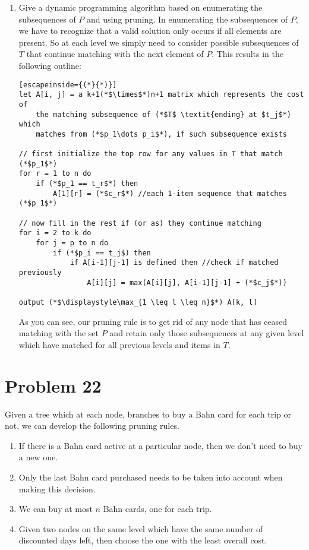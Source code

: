 \documentclass{article}
\providecommand{\prob}[1]{\section*{Problem #1}}
\begin{document}
\begin{enumerate}[label=(\alph*)]
        \item Give a dynamic programming algorithm based on enumerating the subsequences of $P$ and using pruning.
            In enumerating the subsequences of $P$, we have to recognize that a valid solution only occurs if all elements are present. So at each level we simply need to consider possible subsequences of $T$ that continue matching with the next element of $P$. This results in the following outline:

            \begin{lstlisting}[escapeinside={(*}{*)}]
let A[i, j] = a k+1(*$\times$*)n+1 matrix which represents the cost of
    the matching subsequence of (*$T$ \textit{ending} at $t_j$*) which
    matches from (*$p_1\dots p_i$*), if such subsequence exists

// first initialize the top row for any values in T that match (*$p_1$*)
for r = 1 to n do
    if (*$p_1 == t_r$*) then
        A[1][r] = (*$c_r$*) //each 1-item sequence that matches (*$p_1$*)

// now fill in the rest if (or as) they continue matching
for i = 2 to k do
    for j = p to n do
        if (*$p_i == t_j$) then
            if A[i-1][j-1] is defined then //check if matched previously
                A[i][j] = max(A[i][j], A[i-1][j-1] + (*$c_j$*))

output (*$\displaystyle\max_{1 \leq l \leq n}$*) A[k, l]
            \end{lstlisting}

    As you can see, our pruning rule is to get rid of any node that has ceased matching with the set $P$ and retain only those subsequences at any given level which have matched for all previous levels and items in $T$.
    \end{enumerate}

    \prob{22}
    Given a tree which at each node, branches to buy a Bahn card for each trip or not, we can develop the following pruning rules.
    \begin{enumerate}
        \item If there is a Bahn card active at a particular node, then we don't need to buy a new one.
        \item Only the last Bahn card purchased needs to be taken into account when making this decision.
        \item We can buy at most $n$ Bahn cards, one for each trip.
        \item Given two nodes on the same level which have the same number of discounted days left, then choose the one with the least overall cost.
    \end{enumerate}
\end{document}
